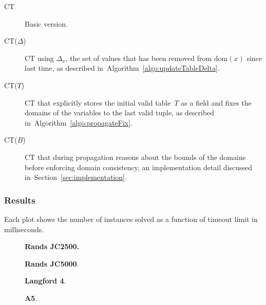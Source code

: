 \documentclass[a4paper,11pt]{article}
\newcommand{\Secref}[1]{Section~\ref{#1}}
\newcommand{\Algoref}[1]{Algorithm~\ref{#1}}
\newcommand{\Dom}[1]{\text{dom}({#1})}
\numberwithin{equation}{section}
\begin{document}
\begin{description}
  \item[CT] Basic version.
  \item[CT($\Delta$)] CT using $\Delta_x$, the set
    of values that has been removed from $\Dom{x}$
    since last time, as described in~\Algoref{algo:updateTableDelta}.
  \item[CT($T$)] CT that explicitly stores the initial valid table~$T$ as
    a field and
    fixes the domains of the variables to the last valid tuple, as described
    in~\Algoref{algo:propagateFix}.
  \item[CT($B$)] CT that during propagation reasons about the bounds of the domains before
    enforcing domain consistency, an implementation detail discussed in~\Secref{sec:implementation}.
\end{description}

\subsubsection{Results}

Each plot shows the number of instances solved as a function
of timeout limit in milliseconds.

\begin{figure}
  \begin{minipage}[b][10cm][s]{0.45\textwidth}
    \centering
    \vfill
    \begin{tikzpicture}[scale=0.8]
      
    \end{tikzpicture}
    \vfill
    \caption{\textbf{Rands JC2500.} }
    \vspace{\baselineskip}
  \end{minipage}\qquad
  \begin{minipage}[b][10cm][s]{0.45\textwidth}
    \centering
    \vfill
    \begin{tikzpicture}[scale=0.8]
      
    \end{tikzpicture}
    \vfill
    \caption{\textbf{Rands JC5000}. }
    \vspace{\baselineskip}
  \end{minipage}\qquad
  \begin{minipage}[b][10cm][s]{0.45\textwidth}
    \centering
    \vfill
    \begin{tikzpicture}[scale=0.8]
      
    \end{tikzpicture}
    \vfill
    \caption{\textbf{Langford 4}.}
    \vspace{\baselineskip}
  \end{minipage}\qquad
  \begin{minipage}[b][10cm][s]{0.45\textwidth}
    \centering
    \vfill
    \begin{tikzpicture}[scale=0.8]
      
    \end{tikzpicture}
    \vfill
    \caption{\textbf{A5}.}
    \vspace{\baselineskip}
  \end{minipage}\qquad

\end{figure}
\end{document}
